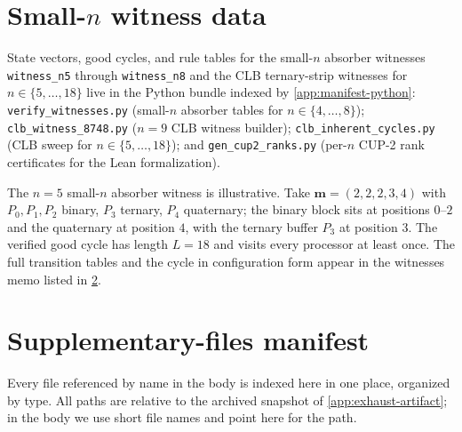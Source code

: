 \documentclass[11pt,a4paper]{article}
\theoremstyle{plain}
\theoremstyle{definition}
\begin{document}
\section{Small-$n$ witness data}\label{app:witness-data}

State vectors, good cycles, and rule tables for the small-$n$
absorber witnesses \texttt{witness\_n5} through \texttt{witness\_n8}
and the CLB ternary-strip witnesses for $n \in \{5, \ldots, 18\}$
live in the Python bundle indexed by \cref{app:manifest-python}:
\texttt{verify\_witnesses.py} (small-$n$ absorber tables for
$n \in \{4, \ldots, 8\}$); \texttt{clb\_witness\_8748.py}
($n = 9$ CLB witness builder); \texttt{clb\_inherent\_cycles.py}
(CLB sweep for $n \in \{5, \ldots, 18\}$); and
\texttt{gen\_cup2\_ranks.py} (per-$n$ CUP-2 rank certificates for
the Lean formalization).

The $n = 5$ small-$n$ absorber witness is illustrative.  Take
$\mathbf{m} = (2, 2, 2, 3, 4)$ with $P_0, P_1, P_2$ binary,
$P_3$ ternary, $P_4$ quaternary; the binary block sits at positions
$0$--$2$ and the quaternary at position $4$, with the ternary buffer
$P_3$ at position $3$.  The verified good cycle has length $L = 18$
and visits every processor at least once.  The full transition
tables and the cycle in configuration form appear in the witnesses
memo listed in \cref{app:manifest}.

\section{Supplementary-files manifest}\label{app:manifest}

Every file referenced by name in the body is indexed here in one
place, organized by type.  All paths are relative to the archived
snapshot of \cref{app:exhaust-artifact}; in the body we use short
file names and point here for the path.
\end{document}
